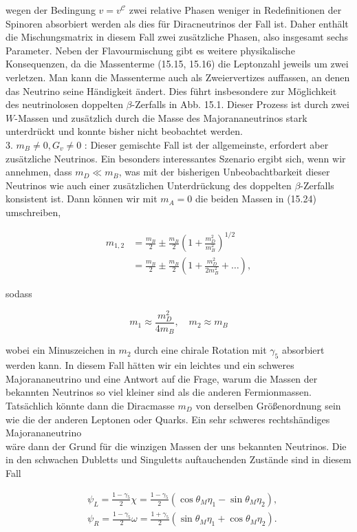 \documentclass[10pt, letterpaper]{article}
\begin{document}
wegen der Bedingung $v=v^{\mathcal{C}}$ zwei relative Phasen weniger in Redefinitionen der Spinoren absorbiert werden als dies für Diracneutrinos der Fall ist. Daher enthält die Mischungsmatrix in diesem Fall zwei zusätzliche Phasen, also insgesamt sechs Parameter. Neben der Flavourmischung gibt es weitere physikalische Konsequenzen, da die Massenterme (15.15, 15.16) die Leptonzahl jeweils um zwei verletzen. Man kann die Massenterme auch als Zweiervertizes auffassen, an denen das Neutrino seine Händigkeit ändert. Dies führt insbesondere zur Möglichkeit des neutrinolosen doppelten $\beta$-Zerfalls in Abb. 15.1. Dieser Prozess ist durch zwei $W$-Massen und zusätzlich durch die Masse des Majorananeutrinos stark unterdrückt und konnte bisher nicht beobachtet werden.\\
3. $m_{B} \neq 0, G_{v} \neq 0$ : Dieser gemischte Fall ist der allgemeinste, erfordert aber zusätzliche Neutrinos. Ein besonders interessantes Szenario ergibt sich, wenn wir annehmen, dass $m_{D} \ll m_{B}$, was mit der bisherigen Unbeobachtbarkeit dieser Neutrinos wie auch einer zusätzlichen Unterdrückung des doppelten $\beta$-Zerfalls konsistent ist. Dann können wir mit $m_{A}=0$ die beiden Massen in (15.24) umschreiben,

$$
\begin{aligned}
m_{1,2} & =\frac{m_{B}}{2} \pm \frac{m_{B}}{2}\left(1+\frac{m_{D}^{2}}{m_{B}^{2}}\right)^{1 / 2} \\
& =\frac{m_{B}}{2} \pm \frac{m_{B}}{2}\left(1+\frac{m_{D}^{2}}{2 m_{B}^{2}}+\ldots\right),
\end{aligned}
$$

sodass

$$
m_{1} \approx \frac{m_{D}^{2}}{4 m_{B}}, \quad m_{2} \approx m_{B}
$$

wobei ein Minuszeichen in $m_{2}$ durch eine chirale Rotation mit $\gamma_{5}$ absorbiert werden kann. In diesem Fall hätten wir ein leichtes und ein schweres Majorananeutrino und eine Antwort auf die Frage, warum die Massen der bekannten Neutrinos so viel kleiner sind als die anderen Fermionmassen. Tatsächlich könnte dann die Diracmasse $m_{D}$ von derselben Größenordnung sein wie die der anderen Leptonen oder Quarks. Ein sehr schweres rechtshändiges Majorananeutrino\\
wäre dann der Grund für die winzigen Massen der uns bekannten Neutrinos. Die in den schwachen Dubletts und Singuletts auftauchenden Zustände sind in diesem Fall

$$
\begin{aligned}
& \psi_{L}=\frac{1-\gamma_{5}}{2} \chi=\frac{1-\gamma_{5}}{2}\left(\cos \theta_{M} \eta_{1}-\sin \theta_{M} \eta_{2}\right), \\
& \psi_{R}=\frac{1-\gamma_{5}}{2} \omega=\frac{1+\gamma_{5}}{2}\left(\sin \theta_{M} \eta_{1}+\cos \theta_{M} \eta_{2}\right) .
\end{aligned}
$$
\end{document}
